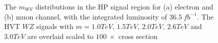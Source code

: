 \begin{figure}[h]
	\begin{center}
	\end{center}
	\caption{The $m_{WV}$ distributions in the HP signal region for (a) electron and (b) muon channel, with the integrated luminosity of $36.5~fb^{-1}$. The HVT $WZ$ signals with $m=1.0TeV$, $1.5TeV$, $2.0TeV$, $2.6TeV$ and $3.0TeV$ are overlaid scaled to $100 ~\times$ cross section}
	\label{Fig:HighPuritySR}
\end{figure}

